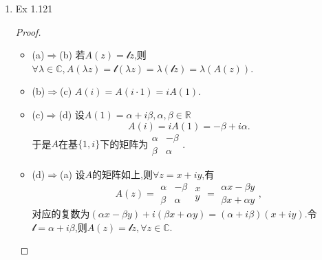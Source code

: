 \documentclass[12pt, a4paper]{article}
\begin{document}
\begin{enumerate}
    \begin{tabular}{|c|c|c|c|c|c|c|}
        \hline
        集合 & $+/-$ & $\times/\div$ & $\cdot^n$ & $\sqrt[n]{\cdot}$ & $e^x$ & $z^x$ \\
        \hline
        $\mathbb{N}$ & $\times$ & $\times$ & $\checkmark$ & $\times$ & $\times$ & $\times$ \\
        \hline
        $\mathbb{Z}$ & $\checkmark$ & $\times$ & $\checkmark$ & $\times$ & $\times$ & $\times$ \\
        \hline
        $\mathbb{Q}$ & $\checkmark$ & $\checkmark$ & $\checkmark$ & $\times$ & $\times$ & $\times$ \\
        \hline
        $\mathbb{R}$ & $\checkmark$ & $\checkmark$ & $\checkmark$ & $\times$ & $\checkmark$ & $\times$ \\
        \hline
        $\mathbb{C}$ & $\checkmark$ & $\checkmark$ & $\checkmark$ & $\checkmark$ & $\checkmark$ & $\checkmark$ \\
        \hline
    \end{tabular}
    \item Ex 1.121 \label{ex:1.121}
    \begin{proof}
        \begin{itemize}
            \item (a)\(\Rightarrow\)(b) 若\(A(z) = \mathscr{l}z\),则\(\forall \lambda \in \mathbb{C}, A(\lambda z) = \mathscr{l}(\lambda z) = \lambda(\mathscr{l}z) = \lambda(A(z))\).
            \item (b)\(\Rightarrow\)(c) \(A(i) = A(i \cdot 1) = iA(1)\).
            \item (c)\(\Rightarrow\)(d) 设\(A(1) = \alpha + i\beta, \alpha, \beta \in \mathbb{R}\)
            \[A(i) = iA(1) = -\beta + i\alpha.\]
            于是\(A\)在基\(\{1, i\}\)下的矩阵为\(\begin{matrix}
                \alpha & -\beta \\
                \beta & \alpha
            \end{matrix}\).
            \item (d)\(\Rightarrow\)(a) 设\(A\)的矩阵如上,则\(\forall z = x + iy\),有
            \[A(z) = \begin{matrix}
                \alpha & -\beta \\
                \beta & \alpha
            \end{matrix}\begin{matrix}
                x \\
                y
            \end{matrix} = \begin{matrix}
                \alpha x - \beta y \\
                \beta x + \alpha y
            \end{matrix},\]
            对应的复数为\((\alpha x - \beta y) + i(\beta x + \alpha y) = (\alpha + i\beta)(x + iy)\).令\(\mathscr{l} = \alpha + i\beta\),则\(A(z) = \mathscr{l}z, \forall z \in \mathbb{C}\).
        \end{itemize}
    \end{proof}
\end{enumerate}
\end{document}
